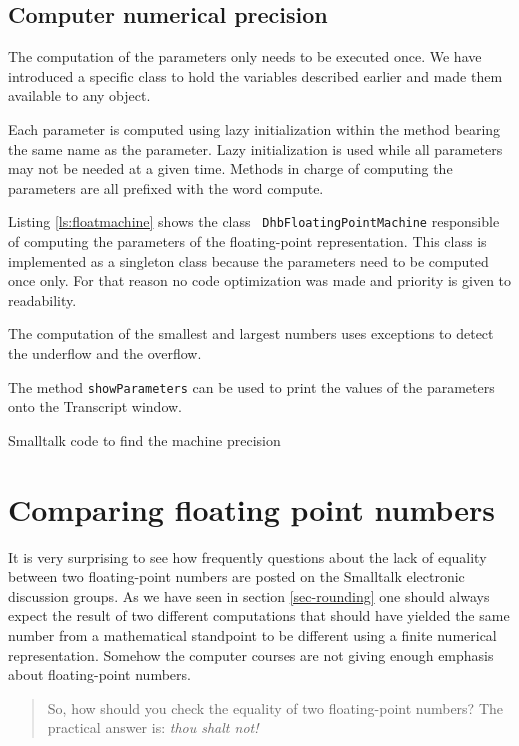 \documentclass[twoside]{book}
\begin{document}
\subsection{Computer numerical precision}
The computation of the parameters only needs to be executed once.
We have introduced a specific class to hold the variables
described earlier and made them available to any object.

Each parameter is computed using lazy initialization within the
method bearing the same name as the parameter. Lazy initialization
is used while all parameters may not be needed at a given time.
Methods in charge of computing the parameters are all prefixed
with the word compute.

Listing \ref{ls:floatmachine} shows the class {\tt
DhbFloatingPointMachine} responsible of computing the parameters
of the floating-point representation. This class is implemented as
a singleton class because the parameters need to be computed once
only. For that reason no code optimization was made and priority
is given to readability.

\noindent The computation of the smallest and largest numbers uses
exceptions to detect the underflow and the overflow.

\noindent The method {\tt showParameters} can be used to print the
values of the parameters onto the Transcript window.

\begin{listing} Smalltalk code to find the machine precision
  \label{ls:floatmachine}
  
\end{listing}


\section{Comparing floating point numbers}
It is very surprising to see how frequently questions about the
lack of equality between two floating-point numbers are posted on
the Smalltalk electronic discussion groups. As we have
seen in section \ref{sec-rounding} one should always expect the
result of two different computations that should have yielded the
same number from a mathematical standpoint to be different using a
finite  numerical representation. Somehow the computer courses are
not giving enough emphasis about floating-point numbers.

\begin{quote}
So, how should you check the equality of two floating-point
numbers? \linebreak\noindent\hfil The practical answer is: {\sl
thou shalt not!}
\end{quote}
\end{document}
